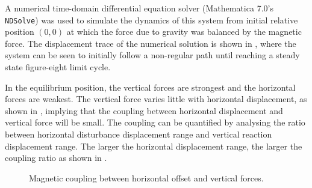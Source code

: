 \documentclass[11pt,a4paper]{memoir}
\begin{document}
A numerical time-domain differential equation solver (Mathematica 7.0's \texttt{NDSolve}) was used to simulate the dynamics of this system from initial relative position $(0,0)$ at which the force due to gravity was balanced by the magnetic force. The displacement trace of the numerical solution is shown in , where the system can be seen to initially follow a non-regular path until reaching a steady state figure-eight limit cycle.

\begin{figure}
  \hfill
\end{figure}

In the equilibrium position, the vertical forces are strongest and the
horizontal forces are weakest. The vertical force varies little with
horizontal displacement, as shown in , implying
that the coupling between horizontal displacement and vertical force will be
small.
The coupling can be quantified by analysing the ratio between horizontal
disturbance displacement range and vertical reaction displacement range.
The larger the horizontal displacement range, the larger the coupling ratio as
shown in .

\begin{figure}
\begin{wide}
  \hfil
\end{wide}
  \caption{
    Magnetic coupling between horizontal offset and vertical forces.}
\end{figure}
\end{document}
